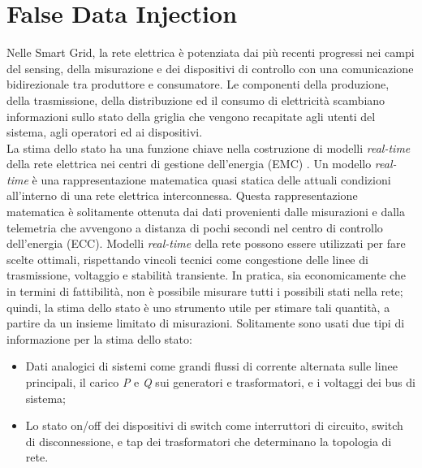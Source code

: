 
\section{False Data Injection}
Nelle Smart Grid, la rete elettrica è potenziata dai più recenti progressi nei campi del sensing, della misurazione e dei dispositivi di controllo con una comunicazione bidirezionale tra produttore e consumatore. Le componenti della produzione, della trasmissione, della distribuzione ed il consumo di elettricità scambiano informazioni sullo stato della griglia che vengono recapitate agli utenti del sistema, agli operatori ed ai dispositivi.\\
La stima dello stato ha una funzione chiave nella costruzione di modelli \emph{real-time} della rete elettrica nei centri di gestione dell'energia (EMC) \cite{monticelli}. Un modello \emph{real-time} è una rappresentazione matematica quasi statica delle attuali condizioni all'interno di una rete elettrica interconnessa. Questa rappresentazione matematica è solitamente ottenuta dai dati provenienti dalle misurazioni e dalla telemetria che avvengono a distanza di pochi secondi nel centro di controllo dell'energia (ECC). Modelli \emph{real-time} della rete possono essere utilizzati per fare scelte ottimali, rispettando vincoli tecnici come congestione delle linee di trasmissione, voltaggio e stabilità transiente. In pratica, sia economicamente che in termini di fattibilità, non è possibile misurare tutti i possibili stati nella rete; quindi, la stima dello stato è uno strumento utile per stimare tali quantità, a partire da un insieme limitato di misurazioni. Solitamente sono usati due tipi di informazione per la stima dello stato:
\begin{itemize}
	\item Dati analogici di sistemi come grandi flussi di corrente alternata sulle linee principali, il carico \emph{P} e \emph{Q} sui generatori e trasformatori, e i voltaggi dei bus di sistema;
	\item Lo stato on/off dei dispositivi di switch come interruttori di circuito, switch di disconnessione, e tap dei trasformatori che determinano la topologia di rete.
\end{itemize}
